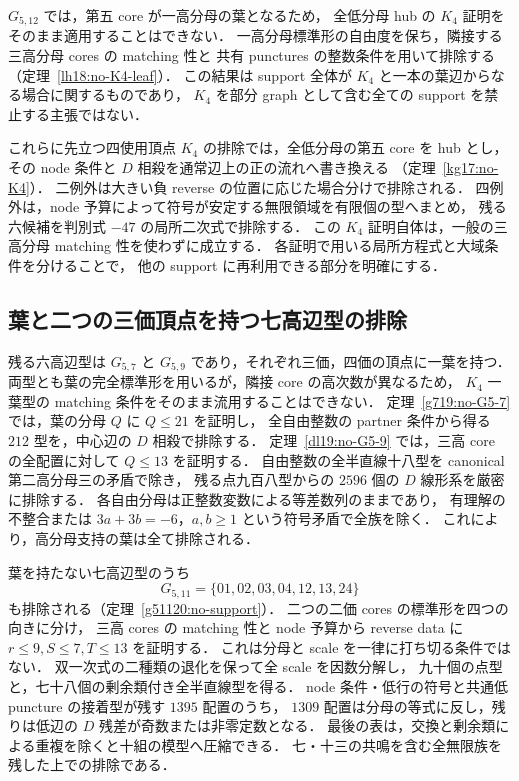 $G_{5,12}$ では，第五 core が一高分母の葉となるため，
全低分母 hub の $K_4$ 証明をそのまま適用することはできない．
一高分母標準形の自由度を保ち，隣接する三高分母 cores の matching 性と
共有 punctures の整数条件を用いて排除する
（定理~\ref{lh18:no-K4-leaf}）．
この結果は support 全体が $K_4$ と一本の葉辺からなる場合に関するものであり，
$K_4$ を部分 graph として含む全ての support を禁止する主張ではない．

これらに先立つ四使用頂点 $K_4$ の排除では，全低分母の第五 core を hub とし，
その node 条件と $D$ 相殺を通常辺上の正の流れへ書き換える
（定理~\ref{kg17:no-K4}）．
二例外は大きい負 reverse の位置に応じた場合分けで排除される．
四例外は，node 予算によって符号が安定する無限領域を有限個の型へまとめ，
残る六候補を判別式 $-47$ の局所二次式で排除する．
この $K_4$ 証明自体は，一般の三高分母 matching 性を使わずに成立する．
各証明で用いる局所方程式と大域条件を分けることで，
他の support に再利用できる部分を明確にする．

\subsection{葉と二つの三価頂点を持つ七高辺型の排除}

残る六高辺型は $G_{5,7}$ と $G_{5,9}$ であり，それぞれ三価，四価の頂点に一葉を持つ．
両型とも葉の完全標準形を用いるが，隣接 core の高次数が異なるため，
$K_4$ 一葉型の matching 条件をそのまま流用することはできない．
定理~\ref{g719:no-G5-7} では，葉の分母 $Q$ に $Q\le21$ を証明し，
全自由整数の partner 条件から得る $212$ 型を，中心辺の $D$ 相殺で排除する．
定理~\ref{dl19:no-G5-9} では，三高 core の全配置に対して $Q\le13$ を証明する．
自由整数の全半直線十八型を canonical 第二高分母三の矛盾で除き，
残る点九百八型からの $2596$ 個の $D$ 線形系を厳密に排除する．
各自由分母は正整数変数による等差数列のままであり，
有理解の不整合または $3a+3b=-6$，$a,b\ge1$ という符号矛盾で全族を除く．
これにより，高分母支持の葉は全て排除される．

葉を持たない七高辺型のうち
\[
 G_{5,11}=\{01,02,03,04,12,13,24\}
\]
も排除される（定理~\ref{g51120:no-support}）．
二つの二価 cores の標準形を四つの向きに分け，
三高 cores の matching 性と node 予算から reverse data に
$r\le9,S\le7,T\le13$ を証明する．
これは分母と scale を一律に打ち切る条件ではない．
双一次式の二種類の退化を保って全 scale を因数分解し，
九十個の点型と，七十八個の剰余類付き全半直線型を得る．
node 条件・低行の符号と共通低 puncture の接着型が残す $1395$ 配置のうち，
$1309$ 配置は分母の等式に反し，残りは低辺の $D$ 残差が奇数または非零定数となる．
最後の表は，交換と剰余類による重複を除くと十組の模型へ圧縮できる．
七・十三の共鳴を含む全無限族を残した上での排除である．


